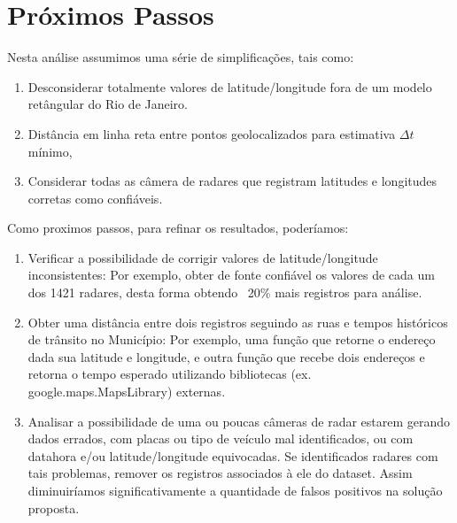 \documentclass{article}
\begin{document}
\section{Próximos Passos}

Nesta análise assumimos uma série de simplificações, tais como:
\begin{enumerate}
\item Desconsiderar totalmente valores de latitude/longitude fora de um modelo retângular do Rio de Janeiro.
\item Distância em linha reta entre pontos geolocalizados para estimativa $ \Delta t $ mínimo,
\item Considerar todas as câmera de radares que registram latitudes e longitudes corretas como confiáveis.
\end{enumerate}


Como proximos passos, para refinar os resultados, poderíamos:
\begin{enumerate}
\item Verificar a possibilidade de corrigir valores de latitude/longitude inconsistentes: Por exemplo, obter de fonte confiável os valores de cada um dos 1421 radares, desta forma obtendo ~20\% mais registros para análise.
\item Obter uma distância entre dois registros seguindo as ruas e tempos históricos de trânsito no Município: Por exemplo, uma função que retorne o endereço dada sua latitude e longitude, e outra função que recebe dois endereços e retorna o tempo esperado utilizando bibliotecas (ex. google.maps.MapsLibrary) externas.
\item Analisar a possibilidade de uma ou poucas câmeras de radar estarem gerando dados errados, com placas ou tipo de veículo mal identificados, ou com datahora e/ou latitude/longitude equivocadas. Se identificados radares com tais problemas, remover os registros associados à ele do dataset. Assim diminuiríamos significativamente a quantidade de falsos positivos na solução proposta.
\end{enumerate}
\end{document}
